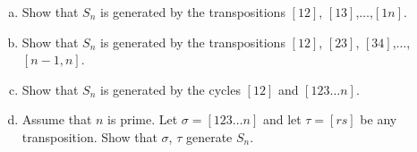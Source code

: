 \documentclass[12pt]{book}
\newcounter{myenumi}
\newenvironment{myenumerate}
{\begin{enumerate}
 \setcounter{enumi}{\themyenumi}
}
{\setcounter{myenumi}{\theenumi}
 \end{enumerate}}
\begin{document}
\begin{myenumerate}
\begin{excopy}
\begin{enumerate}[(a)]
\item
Show that \(S_n\) is generated by the transpositions
\([12]\), \([13]\),\(\ldots\),\([1n]\).
\item
Show that \(S_n\) is generated by the transpositions
\([12]\), \([23]\), \([34]\),\(\ldots\),\([n-1,n]\).
\item
Show that \(S_n\) is generated by the cycles \([12]\) and \([1 2 3 \ldots n]\).
\item
Assume that $n$ is prime. 
Let \(\sigma = [1 2 3 \ldots n]\) and let \(\tau = [rs]\) be any transposition.
Show that \(\sigma\), \(\tau\) generate \(S_n\).
\end{enumerate}
\end{excopy}


\end{myenumerate}
\end{document}
